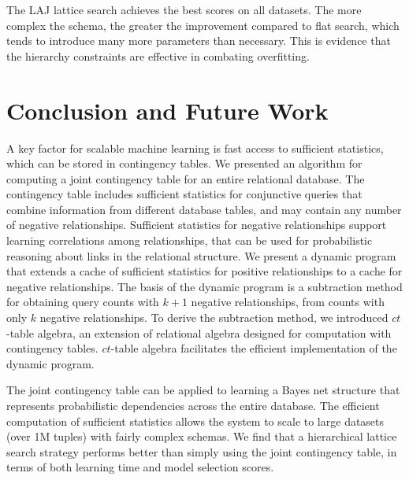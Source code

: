 \documentclass{vldb}
\newcommand{\ct}{\mathit{ct}}
\begin{document}
The LAJ lattice search achieves the best scores on all datasets. The  more complex the schema, the greater the improvement compared to flat search, which tends to introduce many more parameters than necessary. This is evidence that the hierarchy constraints are effective in combating overfitting.

%
%
%


 



\section{Conclusion and Future Work} 

A key factor for scalable machine learning is fast access to sufficient statistics, which can be stored in contingency tables. We presented an algorithm for computing a joint contingency table for an entire relational database. The contingency table includes sufficient statistics for conjunctive queries that combine information from different database tables, and may contain any number of negative relationships. Sufficient statistics for negative relationships support learning correlations among relationships, that can be used for probabilistic reasoning about links in the relational structure. We present a dynamic program that extends a cache of sufficient statistics for positive relationships to a cache for negative relationships. The basis of the dynamic program is a subtraction method for obtaining query counts with $k+1$ negative relationships, from counts with only $k$ negative relationships. To derive the subtraction method, we introduced $\ct$-table algebra, an extension of relational algebra designed for computation with contingency tables. $\ct$-table algebra facilitates the efficient implementation of the dynamic program. 

The joint contingency table can be applied to learning a Bayes net structure that represents probabilistic dependencies across the entire database. The efficient computation of sufficient statistics allows the system to scale to large datasets (over 1M tuples) with fairly complex schemas. We find that a hierarchical lattice search strategy 
\cite{Schulte2012,Qian_LNAI_2014} performs better than simply using the joint contingency table, in terms of both learning time and model selection scores. 
\end{document}
